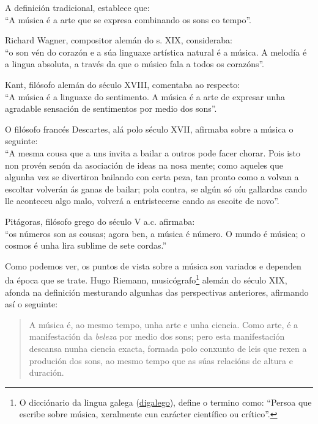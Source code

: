 \documentclass[a4paper, twoside]{templates/ociamthesis}
\providecommand{\tightlist}{%
  \setlength{\itemsep}{0pt}\setlength{\parskip}{0pt}}
\begin{document}
\begin{description}
\tightlist
\item[Música en relación co tempo.]
A definición tradicional, establece que:\\
``A música é a arte que se expresa combinando os sons co tempo''.
\item[Música como arte.]
Richard Wagner, compositor alemán do s. XIX, consideraba:\\
``o son vén do corazón e a súa linguaxe artística natural é a música. A melodía é a lingua absoluta, a través da que o músico fala a todos os corazóns''.
\item[Música como expresión de sentimentos.]
Kant, filósofo alemán do século XVIII, comentaba ao respecto:\\
``A música é a linguaxe do sentimento. A música é a arte de expresar unha agradable sensación de sentimentos por medio dos sons''.
\item[Música como feito musical.]
O filósofo francés Descartes, alá polo século XVII, afirmaba sobre a música o seguinte:\\
``A mesma cousa que a uns invita a bailar a outros pode facer chorar. Pois isto non provén senón da asociación de ideas na nosa mente; como aqueles que algunha vez se divertiron bailando con certa peza, tan pronto como a volvan a escoltar volverán ás ganas de bailar; pola contra, se algún só oíu gallardas cando lle aconteceu algo malo, volverá a entristecerse cando as escoite de novo''.
\item[Música como ciencia.]
Pitágoras, filósofo grego do século V a.c. afirmaba:\\
``os números son as cousas; agora ben, a música é número. O mundo é música; o cosmos é unha lira sublime de sete cordas.''
\end{description}

Como podemos ver, os puntos de vista sobre a música son variados e dependen da época que se trate. Hugo Riemann, musicógrafo\footnote{O dicciónario da lingua galega (\href{https://digalego.xunta.gal/gl/termo/44511/musicografo-fa}{digalego}), define o termino como: ``Persoa que escribe sobre música, xeralmente cun carácter científico ou crítico''.} alemán do século XIX, afonda na definición mesturando algunhas das perspectivas anteriores, afirmando así o seguinte:

\begin{quote}
A música é, ao mesmo tempo, unha arte e unha ciencia. Como arte, é a manifestación da \emph{beleza} por medio dos sons; pero esta manifestación descansa nunha ciencia exacta, formada polo conxunto de leis que rexen a produción dos sons, ao mesmo tempo que as súas relacións de altura e duración.
\end{quote}
\end{document}
